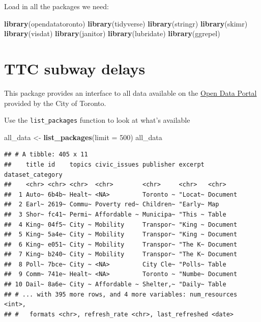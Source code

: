 \documentclass[
]{book}
\newenvironment{Shaded}{\begin{snugshade}}{\end{snugshade}}
\newcommand{\DataTypeTok}[1]{\textcolor[rgb]{0.13,0.29,0.53}{#1}}
\newcommand{\DecValTok}[1]{\textcolor[rgb]{0.00,0.00,0.81}{#1}}
\newcommand{\KeywordTok}[1]{\textcolor[rgb]{0.13,0.29,0.53}{\textbf{#1}}}
\newcommand{\NormalTok}[1]{#1}
\newcommand{\StringTok}[1]{\textcolor[rgb]{0.31,0.60,0.02}{#1}}
\begin{document}
Load in all the packages we need:

\begin{Shaded}
\begin{Highlighting}[]
\KeywordTok{library}\NormalTok{(opendatatoronto)}
\KeywordTok{library}\NormalTok{(tidyverse)}
\KeywordTok{library}\NormalTok{(stringr)}
\KeywordTok{library}\NormalTok{(skimr)}
\KeywordTok{library}\NormalTok{(visdat)}
\KeywordTok{library}\NormalTok{(janitor)}
\KeywordTok{library}\NormalTok{(lubridate)}
\KeywordTok{library}\NormalTok{(ggrepel)}
\end{Highlighting}
\end{Shaded}

\hypertarget{ttc-subway-delays}{%
\section{TTC subway delays}\label{ttc-subway-delays}}

This package provides an interface to all data available on the \href{https://open.toronto.ca/}{Open Data Portal} provided by the City of Toronto.

Use the \texttt{list\_packages} function to look at what's available

\begin{Shaded}
\begin{Highlighting}[]
\NormalTok{all_data <-}\StringTok{ }\KeywordTok{list_packages}\NormalTok{(}\DataTypeTok{limit =} \DecValTok{500}\NormalTok{)}
\NormalTok{all_data}
\end{Highlighting}
\end{Shaded}

\begin{verbatim}
## # A tibble: 405 x 11
##    title id    topics civic_issues publisher excerpt dataset_category
##    <chr> <chr> <chr>  <chr>        <chr>     <chr>   <chr>           
##  1 Auto~ 6b4b~ Healt~ <NA>         Toronto ~ "Locat~ Document        
##  2 Earl~ 2619~ Commu~ Poverty red~ Children~ "Early~ Map             
##  3 Shor~ fc41~ Permi~ Affordable ~ Municipa~ "This ~ Table           
##  4 King~ 04f5~ City ~ Mobility     Transpor~ "King ~ Document        
##  5 King~ 5a4e~ City ~ Mobility     Transpor~ "King ~ Document        
##  6 King~ e051~ City ~ Mobility     Transpor~ "The K~ Document        
##  7 King~ b240~ City ~ Mobility     Transpor~ "The K~ Document        
##  8 Poll~ 7bce~ City ~ <NA>         City Cle~ "Polls~ Table           
##  9 Comm~ 741e~ Healt~ <NA>         Toronto ~ "Numbe~ Document        
## 10 Dail~ 8a6e~ City ~ Affordable ~ Shelter,~ "Daily~ Table           
## # ... with 395 more rows, and 4 more variables: num_resources <int>,
## #   formats <chr>, refresh_rate <chr>, last_refreshed <date>
\end{verbatim}
\end{document}
